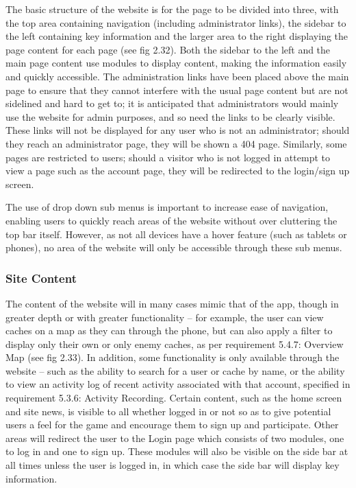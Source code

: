 The basic structure of the website is for the page to be divided into three, with the top area containing navigation (including administrator links), the sidebar to the left containing key information and the larger area to the right displaying the page content for each page (see fig 2.32). Both the sidebar to the left and the main page content use modules to display content, making the information easily and quickly accessible. The administration links have been placed above the main page to ensure that they cannot interfere with the usual page content but are not sidelined and hard to get to; it is anticipated that administrators would mainly use the website for admin purposes, and so need the links to be clearly visible. These links will not be displayed for any user who is not an administrator; should they reach an administrator page, they will be shown a 404 page. Similarly, some pages are restricted to users; should a visitor who is not logged in attempt to view a page such as the account page, they will be redirected to the login/sign up screen.

The use of drop down sub menus is important to increase ease of navigation, enabling users to quickly reach areas of the website without over cluttering the top bar itself. However, as not all devices have a hover feature (such as tablets or phones), no area of the website will only be accessible through these sub menus.

\subsubsection{Site Content}

The content of the website will in many cases mimic that of the app, though in greater depth or with greater functionality – for example, the user can view caches on a map as they can through the phone, but can also apply a filter to display only their own or only enemy caches, as per requirement 5.4.7: Overview Map (see fig 2.33). In addition, some functionality is only available through the website – such as the ability to search for a user or cache by name, or the ability to view an activity log of recent activity associated with that account, specified in requirement 5.3.6: Activity Recording. Certain content, such as the home screen and site news, is visible to all whether logged in or not so as to give potential users a feel for the game and encourage them to sign up and participate. Other areas will redirect the user to the Login page which consists of two modules, one to log in and one to sign up. These modules will also be visible on the side bar at all times unless the user is logged in, in which case the side bar will display key information.

